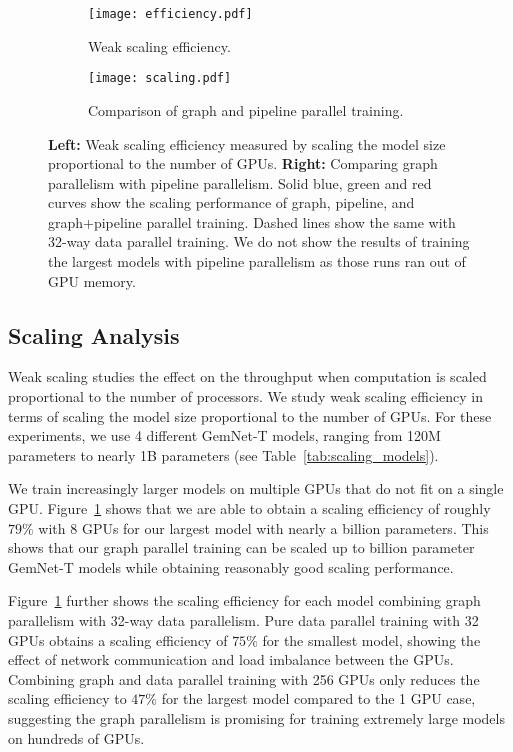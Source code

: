 \documentclass{article} \usepackage{iclr2022_conference,times}
\begin{document}
\begin{figure}[h]
     \begin{subfigure}[b]{0.5\textwidth}
         \centering
         \texttt{[image: efficiency.pdf]}
         \caption{Weak scaling efficiency.}
\label{fig:weak_scaling}
     \end{subfigure}
     \quad
     \begin{subfigure}[b]{0.5\textwidth}
         \centering
         \texttt{[image: scaling.pdf]}
         \caption{Comparison of graph and pipeline parallel training.}
\label{fig:gp_ddp}
     \end{subfigure}

\caption{\textbf{Left:} Weak scaling efficiency measured by scaling the model size proportional to the number of GPUs. \textbf{Right:} Comparing graph parallelism with pipeline parallelism. Solid blue, green and red curves show the scaling performance of graph, pipeline, and graph+pipeline parallel training. Dashed lines show the same with 32-way data parallel training. We do not show the results of training the largest models with pipeline parallelism as those runs ran out of GPU memory.}
\vspace{-10pt}
\end{figure}

\subsection{Scaling Analysis}
\label{sec:scaling}

Weak scaling studies the effect on the throughput when computation is scaled proportional to the number of processors. We study weak scaling efficiency in terms of scaling the model size proportional to the number of GPUs. For these experiments, we use 4 different GemNet-T models, ranging from 120M parameters to nearly 1B parameters (see Table~\ref{tab:scaling_models}).

We train increasingly larger models on multiple GPUs that do not fit on a single GPU. Figure~\ref{fig:weak_scaling} shows that we are able to obtain a scaling efficiency of roughly $79\%$ with 8 GPUs for our largest model with nearly a billion parameters. This shows that our graph parallel training can be scaled up to billion parameter GemNet-T models while obtaining reasonably good scaling performance.

Figure~\ref{fig:weak_scaling} further shows the scaling efficiency for each model combining graph parallelism with 32-way data parallelism. Pure data parallel training with 32 GPUs obtains a scaling efficiency of $75\%$ for the smallest model, showing the effect of network communication and load imbalance between the GPUs. Combining graph and data parallel training with 256 GPUs only reduces the scaling efficiency to $47\%$ for the largest model compared to the 1 GPU case, suggesting the graph parallelism is promising for training extremely large models on hundreds of GPUs.
\end{document}
